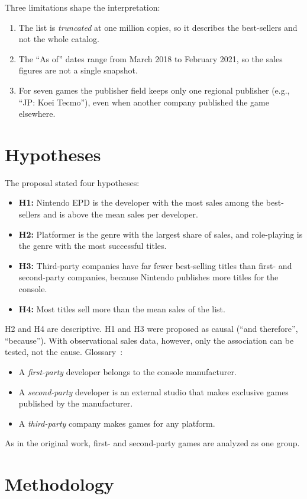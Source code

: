 \documentclass[conference]{IEEEtran}
\begin{document}
Three limitations shape the interpretation:
\begin{enumerate}
  \item The list is \emph{truncated} at one million copies, so it describes the best-sellers and not the whole catalog.
  \item The ``As of'' dates range from March 2018 to February 2021, so the sales figures are not a single snapshot.
  \item For seven games the publisher field keeps only one regional publisher (e.g., ``JP: Koei Tecmo''), even when another company published the game elsewhere.
\end{enumerate}

\section{Hypotheses}
The proposal stated four hypotheses:
\begin{itemize}
  \item \textbf{H1:} Nintendo EPD is the developer with the most sales among the best-sellers and is above the mean sales per developer.
  \item \textbf{H2:} Platformer is the genre with the largest share of sales, and role-playing is the genre with the most successful titles.
  \item \textbf{H3:} Third-party companies have far fewer best-selling titles than first- and second-party companies, because Nintendo publishes more titles for the console.
  \item \textbf{H4:} Most titles sell more than the mean sales of the list.
\end{itemize}

H2 and H4 are descriptive. H1 and H3 were proposed as causal (``and therefore'', ``because''). With observational sales data, however, only the association can be tested, not the cause. Glossary~\cite{otaku}:
\begin{itemize}
  \item A \emph{first-party} developer belongs to the console manufacturer.
  \item A \emph{second-party} developer is an external studio that makes exclusive games published by the manufacturer.
  \item A \emph{third-party} company makes games for any platform.
\end{itemize}
As in the original work, first- and second-party games are analyzed as one group.

\section{Methodology}
\end{document}
